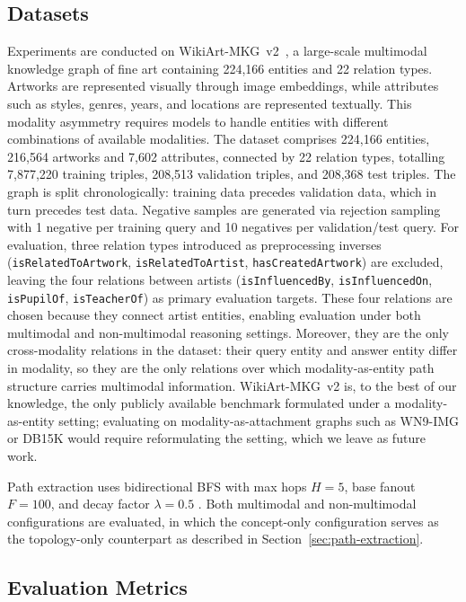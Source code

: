 \documentclass[runningheads]{llncs}
\begin{document}
\subsection{Datasets}
\label{sec:datasets}

Experiments are conducted on WikiArt-MKG~v2~\cite{efthymiou2026vlkge},
a large-scale multimodal knowledge graph of fine art containing
224,166 entities and 22 relation types. Artworks are represented
visually through image embeddings, while attributes such as styles,
genres, years, and locations are represented textually. This modality
asymmetry requires models to handle entities with different
combinations of available modalities. The dataset comprises 224,166
entities, 216,564 artworks and 7,602 attributes, connected by 22
relation types, totalling 7,877,220 training triples, 208,513
validation triples, and 208,368 test triples. The graph is split
chronologically: training data precedes validation data, which in
turn precedes test data. Negative samples are generated via rejection
sampling with 1 negative per training query and 10 negatives per
validation/test query. For evaluation, three relation types
introduced as preprocessing inverses
(\texttt{isRelatedToArtwork}, \texttt{isRelatedToArtist},
\texttt{hasCreatedArtwork}) are excluded, leaving the four
relations between artists (\texttt{isInfluencedBy},
\texttt{isInfluencedOn}, \texttt{isPupilOf}, \texttt{isTeacherOf})
as primary evaluation targets. These four relations are chosen
because they connect artist entities, enabling evaluation under both
multimodal and non-multimodal reasoning settings. Moreover, they are
the only cross-modality relations in the dataset: their query entity
and answer entity differ in modality, so they are the only relations
over which modality-as-entity path structure carries multimodal
information. WikiArt-MKG~v2 is, to the best of our knowledge, the only
publicly available benchmark formulated under a modality-as-entity
setting; evaluating on modality-as-attachment graphs such as WN9-IMG
or DB15K would require reformulating the setting, which we leave as
future work.

Path extraction uses bidirectional BFS with max hops $H = 5$, base
fanout $F = 100$, and decay factor $\lambda = 0.5$
\cite{icaart26}. Both multimodal and non-multimodal configurations are evaluated, in which the concept-only configuration serves as the topology-only counterpart as described in
Section~\ref{sec:path-extraction}.

\subsection{Evaluation Metrics}
\label{sec:evaluation-metrics}
\end{document}
